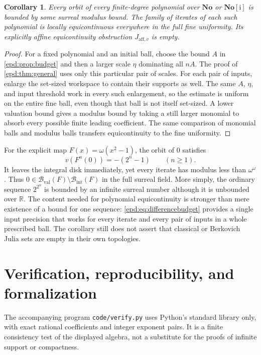\documentclass[11pt,a4paper]{article}
\numberwithin{equation}{section}
\theoremstyle{plain}
\newtheorem{corollary}[corollary]{Corollary}
\theoremstyle{definition}
\theoremstyle{remark}
\newcommand{\No}{\mathbf{No}}
\newcommand{\SC}{\No[\mathrm i]}
\newcommand{\R}{\mathbb R}
\newcommand{\BI}{\mathcal B_{\mathrm{int}}}
\newcommand{\BV}{\mathcal B_{\mathrm{val}}}
\begin{document}
\begin{corollary}\label{epd:cor:surreal-all}
Every orbit of every finite-degree polynomial over $\No$ or $\SC$ is
bounded by some surreal modulus bound. The family of iterates of each
such polynomial is locally equicontinuous everywhere in the full fine
uniformity. Its explicitly affine equicontinuity obstruction
$J_{\mathrm{aff},v}$ is empty.
\end{corollary}
\begin{proof}
For a fixed polynomial and an initial ball, choose the bound $A$ in
\cref{epd:prop:budget} and then a larger scale $\eta$ dominating all $nA$.
The proof of \cref{epd:thm:general} uses only this particular pair of
scales. For each pair of inputs, enlarge the set-sized workspace to
contain their supports as well. The same $A$, $\eta$, and input
threshold work in every such enlargement, so the estimate is uniform
on the entire fine ball, even though that ball is not itself set-sized.
A lower valuation bound gives a modulus bound
by taking a still larger monomial to absorb every possible finite
leading coefficient. The same comparison of monomial balls
and modulus balls transfers equicontinuity to the fine uniformity.
\end{proof}

For the explicit map $F(x)=\omega(x^2-1)$, the orbit of $0$ satisfies
\[
 v(F^n(0))=-(2^n-1)\qquad(n\geq1).
\]
It leaves the integral disk immediately, yet every iterate has modulus
less than $\omega^\omega$. Thus $0\in\BV(F)\setminus\BI(F)$ in the
full surreal field. More simply, the ordinary sequence $2^{2^n}$ is
bounded by an infinite surreal number although it is unbounded over
$\R$. The content needed
for polynomial equicontinuity is stronger than mere existence of a
bound for one sequence: \eqref{epd:eq:differencebudget} provides a single
input precision that works for every iterate and every pair of inputs
in a whole prescribed ball. The corollary still does not assert that
classical or Berkovich Julia sets are empty in their own topologies.

\section{Verification, reproducibility, and formalization}
\label{epd:sec:verification}
The accompanying program \texttt{code/verify.py} uses Python's standard
library only, with exact rational coefficients and integer exponent
pairs. It is a finite consistency test of the displayed algebra, not
a substitute for the proofs of infinite support or compactness.
\end{document}
